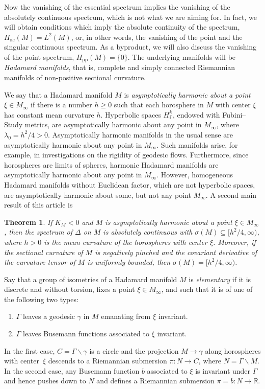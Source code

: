 \documentclass[11pt]{article}
\numberwithin{equation}{section}
\numberwithin{equation}{section}
\newtheorem{Theorem}{Theorem}[section]
\def\p{\mathrm{pp}}
\def\ac{\mathrm{ac}}
\def\F{\mathbb F}
\def\R{\mathbb R}
\begin{document}
Now the vanishing of the essential spectrum implies the vanishing of the absolutely continuous spectrum,
which is not what we are aiming for.
In fact, we will obtain conditions which imply the absolute continuity of the spectrum, $H_{\ac}(M)=L^2(M)$,
or, in other words, the vanishing of the point and the singular continuous spectrum.
As a byproduct, we will also discuss the vanishing of the point spectrum, $H_{\p}(M)=\{0\}$.
The underlying manifolds will be \emph{Hadamard manifolds}, that is,
complete and simply connected Riemannian manifolds of non-positive sectional curvature.


\setcounter{Theorem}{1}
We say that a Hadamard manifold $M$ is \emph{asymptotically harmonic about a point $\xi\in M_\infty$}
if there is a number $h\ge0$ such that each horosphere in $M$ with center $\xi$ has constant mean curvature $h$.
Hyperbolic spaces $H^k_{\F}$, endowed with Fubini--Study metrics, are asymptotically harmonic about any point in $M_\infty$, where $\lambda_0=h^2/4>0$.
Asymptotically harmonic manifolds in the usual sense are asymptotically harmonic about any point in $M_\infty$.
Such manifolds arise, for example, in investigations on the rigidity of geodesic flows.
Furthermore, since horospheres are limits of spheres,
harmonic Hadamard manifolds are asymptotically harmonic about any point in $M_\infty$.
However, homogeneous Hadamard manifolds without Euclidean factor,
which are not hyperbolic spaces, are asymptotically harmonic about some, but not any point $M_\infty$.
A second main result of this article is

\begin{Theorem}\label{onlyacm}
If $K_M<0$ and $M$ is asymptotically harmonic about a point $\xi\in M_\infty$,
then the spectrum of $\Delta$ on $M$ is absolutely continuous with $\sigma(M)\subseteq\bigl[h^2/4,\infty\bigr)$,
where $h>0$ is the mean curvature of the horospheres with center $\xi$.
Moreover, if the sectional curvature of $M$ is negatively pinched and the covariant derivative of the curvature tensor of $M$ is uniformly bounded, then $\sigma(M)=\bigl[h^2/4,\infty\bigr)$.
\end{Theorem}

Say that a group of isometries of a Hadamard manifold $M$ is \emph{elementary}
if it is discrete and without torsion, fixes a point $\xi\in M_\infty$,
and such that it is of one of the following two types:
\begin{enumerate}[label=(\alph*)]\itemsep=0pt
\item\label{ax} $\Gamma$ leaves a geodesic $\gamma$ in $M$ emanating from $\xi$ invariant.
\item\label{pa} $\Gamma$ leaves Busemann functions associated to $\xi$ invariant.
\end{enumerate}
In the first case, $C=\Gamma\backslash\gamma$ is a circle and the projection $M\to\gamma$
along horospheres with center~$\xi$ descends to a Riemannian submersion $\pi\colon N\to C$,
where $N=\Gamma\backslash M$.
In the second case,
any Busemann function $b$ associated to $\xi$ is invariant under $\Gamma$
and hence pushes down to $N$ and defines a Riemannian submersion $\pi=b\colon N\to\R$.
\end{document}
